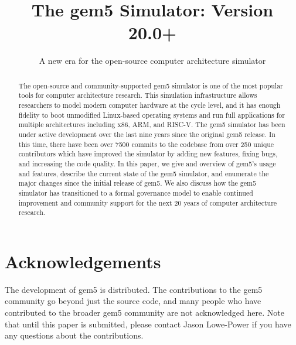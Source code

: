 \documentclass[acmlarge,nonacm,screen=true]{acmart}
\begin{document}
\title{The gem5 Simulator: Version 20.0+}
\subtitle{A new era for the open-source computer architecture simulator}



\begin{abstract}
    The open-source and community-supported gem5 simulator is one of the most popular tools for computer architecture research.
    This simulation infrastructure allows researchers to model modern computer hardware at the cycle level, and it has enough fidelity to boot unmodified Linux-based operating systems and run full applications for multiple architectures including x86, ARM, and RISC-V.
    The gem5 simulator has been under active development over the last nine years since the original gem5 release.
    In this time, there have been over 7500 commits to the codebase from over 250 unique contributors which have improved the simulator by adding new features, fixing bugs, and increasing the code quality.
    In this paper, we give and overview of gem5's usage and features, describe the current state of the gem5 simulator, and enumerate the major changes since the initial release of gem5.
    We also discuss how the gem5 simulator has transitioned to a formal governance model to enable continued improvement and community support for the next 20 years of computer architecture research.
\end{abstract}

\maketitle
\renewcommand{\shortauthors}{Lowe-Power and the gem5 Community}





\section{Acknowledgements}
\label{sec:acks}

The development of gem5 is distributed.
The contributions to the gem5 community go beyond just the source code, and many people who have contributed to the broader gem5 community are not acknowledged here.
Note that until this paper is submitted, please contact Jason Lowe-Power if you have any questions about the contributions.
\end{document}
